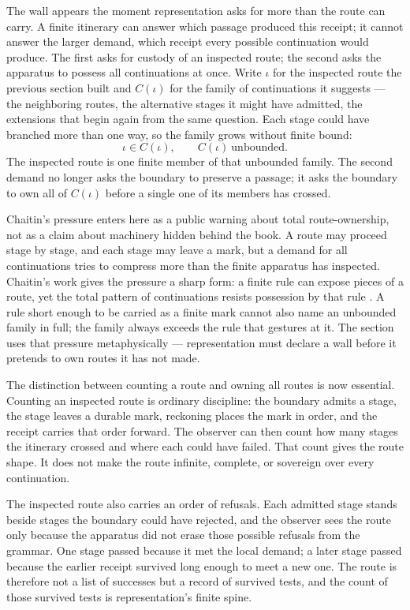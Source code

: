The wall appears the moment representation asks for more than the route can carry. A finite itinerary can answer which passage produced this receipt; it cannot answer the larger demand, which receipt every possible continuation would produce. The first asks for custody of an inspected route; the second asks the apparatus to possess all continuations at once. Write $\iota$ for the inspected route the previous section built and $C(\iota)$ for the family of continuations it suggests --- the neighboring routes, the alternative stages it might have admitted, the extensions that begin again from the same question. Each stage could have branched more than one way, so the family grows without finite bound:
\[ \iota \in C(\iota), \qquad C(\iota) \ \text{unbounded}. \]
The inspected route is one finite member of that unbounded family. The second demand no longer asks the boundary to preserve a passage; it asks the boundary to own all of $C(\iota)$ before a single one of its members has crossed.

Chaitin's pressure enters here as a public warning about total route-ownership, not as a claim about machinery hidden behind the book. A route may proceed stage by stage, and each stage may leave a mark, but a demand for all continuations tries to compress more than the finite apparatus has inspected. Chaitin's work gives the pressure a sharp form: a finite rule can expose pieces of a route, yet the total pattern of continuations resists possession by that rule \cite{chaitin1975}. A rule short enough to be carried as a finite mark cannot also name an unbounded family in full; the family always exceeds the rule that gestures at it. The section uses that pressure metaphysically --- representation must declare a wall before it pretends to own routes it has not made.

The distinction between counting a route and owning all routes is now essential. Counting an inspected route is ordinary discipline: the boundary admits a stage, the stage leaves a durable mark, reckoning places the mark in order, and the receipt carries that order forward. The observer can then count how many stages the itinerary crossed and where each could have failed. That count gives the route shape. It does not make the route infinite, complete, or sovereign over every continuation.

The inspected route also carries an order of refusals. Each admitted stage stands beside stages the boundary could have rejected, and the observer sees the route only because the apparatus did not erase those possible refusals from the grammar. One stage passed because it met the local demand; a later stage passed because the earlier receipt survived long enough to meet a new one. The route is therefore not a list of successes but a record of survived tests, and the count of those survived tests is representation's finite spine.

